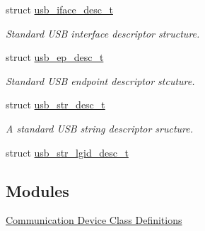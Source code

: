 \begin{DoxyCompactItemize}
struct \hyperlink{structusb__iface__desc__t}{usb\-\_\-iface\-\_\-desc\-\_\-t}
\begin{DoxyCompactList}\small\item\em \-Standard \-U\-S\-B interface descriptor structure. \end{DoxyCompactList}\item 
struct \hyperlink{structusb__ep__desc__t}{usb\-\_\-ep\-\_\-desc\-\_\-t}
\begin{DoxyCompactList}\small\item\em \-Standard \-U\-S\-B endpoint descriptor stcuture. \end{DoxyCompactList}\item 
struct \hyperlink{structusb__str__desc__t}{usb\-\_\-str\-\_\-desc\-\_\-t}
\begin{DoxyCompactList}\small\item\em \-A standard \-U\-S\-B string descriptor sructure. \end{DoxyCompactList}\item 
struct \hyperlink{structusb__str__lgid__desc__t}{usb\-\_\-str\-\_\-lgid\-\_\-desc\-\_\-t}
\end{DoxyCompactItemize}
\subsection*{\-Modules}
\begin{DoxyCompactItemize}
\item 
\hyperlink{group__cdc__protocol__group}{\-Communication Device Class Definitions}
\end{DoxyCompactItemize}
